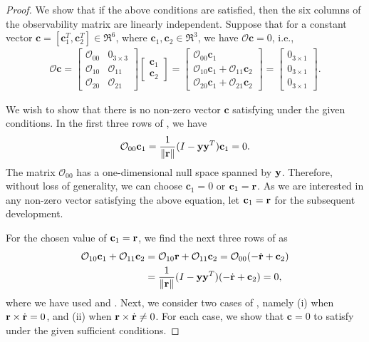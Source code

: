 \begin{proof}
We show that if the above conditions are satisfied, then the six columns of the observability matrix are linearly independent. Suppose that for a constant vector $\mathbf{c}=[\mathbf{c}_1^T,\mathbf{c}_2^T]\in\Re^6$, where $\mathbf{c}_1,\mathbf{c}_2\in\Re^3$, we have $\mathcal{O}\mathbf{c}=0$, i.e., 
\begin{align}
\mathcal{O} \mathbf{c} = \begin{bmatrix}
\mathcal{O}_{00} & 0_{3\times 3}\\
\mathcal{O}_{10} & \mathcal{O}_{11}\\
\mathcal{O}_{20} & \mathcal{O}_{21}
\end{bmatrix}
\begin{bmatrix} \mathbf{c}_1 \\ \mathbf{c}_2 \end{bmatrix}
=
\begin{bmatrix}
\mathcal{O}_{00}\mathbf{c}_1\\
\mathcal{O}_{10}\mathbf{c}_1+ \mathcal{O}_{11}\mathbf{c}_2\\
\mathcal{O}_{20}\mathbf{c}_1+ \mathcal{O}_{21}\mathbf{c}_2
\end{bmatrix}
=
\begin{bmatrix}
0_{3\times 1}\\
0_{3\times 1}\\
0_{3\times 1}
\end{bmatrix}.\label{eqn:Oc}
\end{align}

We wish to show that there is no non-zero vector $\mathbf{c}$ satisfying  under the given conditions. In the first three rows of , we have
\begin{align}
\mathcal{O}_{00} \mathbf{c}_1 = \frac{1}{\|\mathbf{r}\|}(I-\mathbf{y}\mathbf{y}^T) \mathbf{c}_1 = 0.\label{eqn:c10}
\end{align}
The matrix $\mathcal{O}_{00}$ has a one-dimensional null space spanned by $\mathbf{y}$. Therefore, without loss of generality, we can choose $\mathbf{c}_1=0$ or $\mathbf{c}_1=\mathbf{r}$. As we are interested in any non-zero vector satisfying the above equation, let $\mathbf{c}_1=\mathbf{r}$ for the subsequent development.

For the chosen value of $\mathbf{c}_1=\mathbf{r}$, we find the next three rows of  as
\begin{align}
\mathcal{O}_{10} \mathbf{c}_1 +\mathcal{O}_{11} \mathbf{c}_2 & = \mathcal{O}_{10} \mathbf{r} +\mathcal{O}_{11} \mathbf{c}_2  = \mathcal{O}_{00} (-\dot{\mathbf{r}} + \mathbf{c}_2)\nonumber\\
& = \frac{1}{\|\mathbf{r}\|}(I-\mathbf{y}\mathbf{y}^T)(-\dot{\mathbf{r}} + \mathbf{c}_2)=0,\label{eqn:row2}
\end{align}
where we have used  and . Next, we consider two cases of , namely (i) when $\mathbf{r}\times\dot{\mathbf{r}}=0$, and (ii) when $\mathbf{r}\times\dot{\mathbf{r}}\neq 0$. For each case, we show that $\mathbf{c}=0$ to satisfy  under the given sufficient conditions.


\end{proof}
